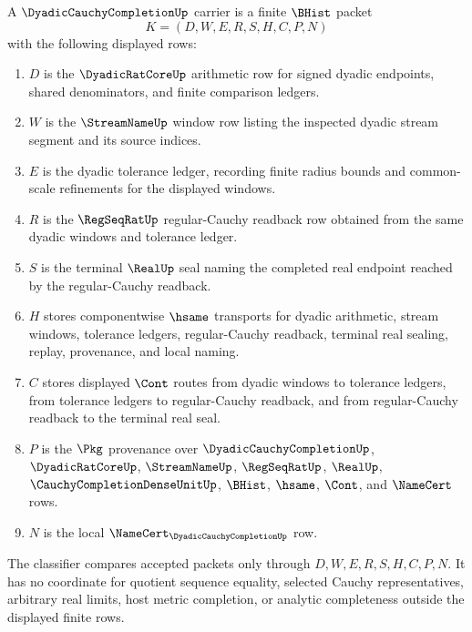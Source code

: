 \begin{definition}
\label{def:dyadic-cauchy-completion-carrier}
A $\DyadicCauchyCompletionUp$ carrier is a finite $\BHist$ packet
$$
K=(D,W,E,R,S,H,C,P,N)
$$
with the following displayed rows:
\begin{enumerate}
\item $D$ is the $\DyadicRatCoreUp$ arithmetic row for signed dyadic endpoints, shared denominators, and finite comparison ledgers.
\item $W$ is the $\StreamNameUp$ window row listing the inspected dyadic stream segment and its source indices.
\item $E$ is the dyadic tolerance ledger, recording finite radius bounds and common-scale refinements for the displayed windows.
\item $R$ is the $\RegSeqRatUp$ regular-Cauchy readback row obtained from the same dyadic windows and tolerance ledger.
\item $S$ is the terminal $\RealUp$ seal naming the completed real endpoint reached by the regular-Cauchy readback.
\item $H$ stores componentwise $\hsame$ transports for dyadic arithmetic, stream windows, tolerance ledgers, regular-Cauchy readback, terminal real sealing, replay, provenance, and local naming.
\item $C$ stores displayed $\Cont$ routes from dyadic windows to tolerance ledgers, from tolerance ledgers to regular-Cauchy readback, and from regular-Cauchy readback to the terminal real seal.
\item $P$ is the $\Pkg$ provenance over $\DyadicCauchyCompletionUp$, $\DyadicRatCoreUp$, $\StreamNameUp$, $\RegSeqRatUp$, $\RealUp$, $\CauchyCompletionDenseUnitUp$, $\BHist$, $\hsame$, $\Cont$, and $\NameCert$ rows.
\item $N$ is the local $\NameCert_{\DyadicCauchyCompletionUp}$ row.
\end{enumerate}
The classifier compares accepted packets only through $D,W,E,R,S,H,C,P,N$. It has no coordinate for quotient sequence equality, selected Cauchy representatives, arbitrary real limits, host metric completion, or analytic completeness outside the displayed finite rows.
\end{definition}

